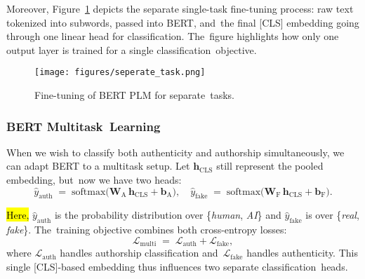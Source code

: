 \documentclass[electronics,article,accept,pdftex,moreauthors,electronics]{Definitions/mdpi}
\begin{document}
Moreover, Figure~\ref{fig5} depicts the separate single-task fine-tuning process: raw text tokenized into subwords, passed into BERT, and~the final [CLS] embedding going through one linear head for classification. The~figure highlights how only one output layer is trained for a single classification~objective.
\vspace{-4pt}
\begin{figure}[H] %
    \texttt{[image: figures/seperate\_task.png]}
    \caption{Fine-tuning of BERT PLM for separate~tasks.}
    \label{fig5}
\end{figure}


\subsubsection{BERT Multitask~Learning}

When we wish to classify both authenticity and authorship simultaneously, we can adapt BERT to a multitask setup. Let $\mathbf{h}_\text{CLS}$ still represent the pooled embedding, but~now we have two heads:
\vspace{6pt}
\begin{equation}
\hat{y}_\text{auth} \;=\; \mathrm{softmax}\bigl(\mathbf{W}_\text{A}\,\mathbf{h}_\text{CLS} + \mathbf{b}_\text{A}\bigr),
\quad
\hat{y}_\text{fake} \;=\; \mathrm{softmax}\bigl(\mathbf{W}_\text{F}\,\mathbf{h}_\text{CLS} + \mathbf{b}_\text{F}\bigr).
\end{equation}

\hl{Here,} %
 $\hat{y}_\text{auth}$ is the probability distribution over \{\textit{human}, \textit{AI}\} and $\hat{y}_\text{fake}$ is over \{\textit{real}, \textit{fake}\}. The~training objective combines both cross-entropy losses:
\begin{equation}
\label{eq:multitask_loss}
\mathcal{L}_\text{multi} \;=\; \mathcal{L}_\text{auth} + \mathcal{L}_\text{fake},
\end{equation}
where $\mathcal{L}_\text{auth}$ handles authorship classification and~$\mathcal{L}_\text{fake}$ handles authenticity. This single [CLS]-based embedding thus influences two separate classification~heads.
\end{document}

